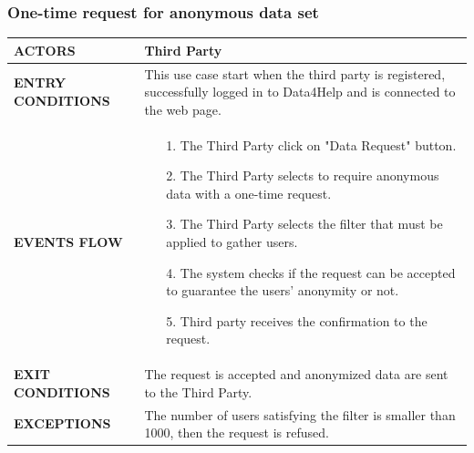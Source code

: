 \documentclass[a4paper]{article}
\begin{document}
\vspace{1cm}

\subsubsection{One-time request for anonymous data set}
\begin{center}
    \begin{tabular}{l || p{8cm} ||}
        \bf{ACTORS} & Third Party \\ \hline
        \bf{ENTRY CONDITIONS} & This use case start when the third party is registered, successfully logged in to Data4Help and is connected to the web page.\\ \hline
        \bf{EVENTS FLOW} & \begin{itemize}[noitemsep, topsep=0cm, leftmargin=*] \vspace{-0.2cm}
            \item[1.] The Third Party click on "Data Request" button.
            \item[2.] The Third Party selects to require anonymous data with a one-time request.
            \item[3.] The Third Party selects the filter that must be applied to gather users.
            \item[4.] The system checks if the request can be accepted to guarantee the users' anonymity or not.
            \item[5.] Third party receives the confirmation to the request.
        \end{itemize}
        \\ \hline
        \bf{EXIT CONDITIONS} & The request is accepted and anonymized data are sent to the Third Party.\\ \hline
        \bf{EXCEPTIONS} & The number of users satisfying the filter is smaller than 1000, then the request is refused. 
        \\ \hline \hline
    \end{tabular}
\end{center}

\vspace{1cm}
\end{document}
